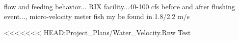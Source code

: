 \documentclass{article}
\begin{document}


flow and feeding behavior... RIX facility...40-100 cfs before and after flushing event..., micro-velocity meter fish my be found in 1.8/2.2 m/s

<<<<<<< HEAD:Project_Plans/Water_Velocity.Rnw
Test
\end{document}
